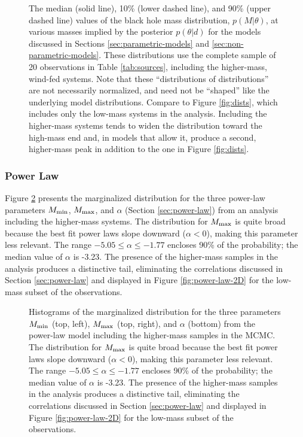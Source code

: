 \documentclass[preprint]{aastex}
\newcommand{\Mmin}{M_{\textnormal{min}}}
\newcommand{\Mmax}{M_{\textnormal{max}}}
\begin{document}
\begin{figure}
  \begin{center}
  \end{center}
  \caption{\label{fig:high-mass-dists} The median (solid line), 10\%
    (lower dashed line), and 90\% (upper dashed line) values of the
    black hole mass distribution, $p(M|\theta)$, at various masses
    implied by the posterior $p(\theta|d)$ for the models discussed in
    Sections \ref{sec:parametric-models} and
    \ref{sec:non-parametric-models}.  These distributions use the
    complete sample of 20 observations in Table \ref{tab:sources},
    including the higher-mass, wind-fed systems.  Note that these
    ``distributions of distributions'' are not necessarily normalized,
    and need not be ``shaped'' like the underlying model
    distributions.  Compare to Figure \ref{fig:dists}, which includes
    only the low-mass systems in the analysis.  Including the
    higher-mass systems tends to widen the distribution toward the
    high-mass end and, in models that allow it, produce a second,
    higher-mass peak in addition to the one in Figure
    \ref{fig:dists}. }
\end{figure}

\subsubsection{Power Law}

Figure \ref{fig:power-law-high} presents the marginalized
distribution for the three power-law parameters $\Mmin$, $\Mmax$, and
$\alpha$ (Section \ref{sec:power-law}) from an analysis including the
higher-mass systems.  The distribution for $\Mmax$ is quite broad
because the best fit power laws slope downward ($\alpha < 0$), making
this parameter less relevant.  The range $-5.05 \leq \alpha \leq
-1.77$ encloses 90\% of the probability; the median value of $\alpha$
is -3.23.  The presence of the higher-mass samples in the analysis
produces a distinctive tail, eliminating the correlations discussed in
Section \ref{sec:power-law} and displayed in Figure
\ref{fig:power-law-2D} for the low-mass subset of the observations.

\begin{figure}
  \begin{center}
  \end{center}
  \caption{\label{fig:power-law-high} Histograms of the marginalized
    distribution for the three parameters $\Mmin$ (top, left), $\Mmax$
    (top, right), and $\alpha$ (bottom) from the power-law model
    including the higher-mass samples in the MCMC.  The distribution
    for $\Mmax$ is quite broad because the best fit power laws slope
    downward ($\alpha < 0$), making this parameter less relevant.  The
    range $-5.05 \leq \alpha \leq -1.77$ encloses 90\% of the
    probability; the median value of $\alpha$ is -3.23.  The presence
    of the higher-mass samples in the analysis produces a distinctive
    tail, eliminating the correlations discussed in Section
    \ref{sec:power-law} and displayed in Figure \ref{fig:power-law-2D}
    for the low-mass subset of the observations. }
\end{figure}
\end{document}
